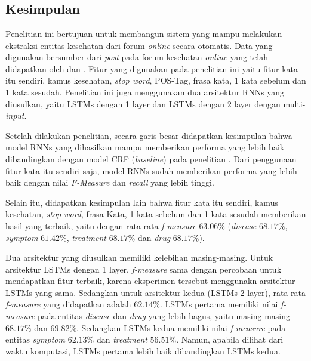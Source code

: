 \chapter{\babEnam}

\section{Kesimpulan}
Penelitian ini bertujuan untuk membangun sistem yang mampu melakukan ekstraksi entitas kesehatan dari forum \textit{online} secara otomatis. Data yang digunakan bersumber dari \textit{post} pada forum kesehatan \textit{online} yang telah didapatkan oleh \cite{skripsiKakRadit} dan \saya. Fitur yang digunakan pada penelitian ini yaitu fitur kata itu sendiri, kamus kesehatan, \textit{stop word}, POS-Tag, frasa kata,  1 kata sebelum dan 1 kata sesudah. Penelitian ini juga menggunakan dua arsitektur RNNs yang diusulkan, yaitu LSTMs dengan 1 layer dan LSTMs dengan 2 layer dengan multi-\textit{input}.

Setelah dilakukan penelitian, secara garis besar didapatkan kesimpulan bahwa model RNNs yang dihasilkan mampu memberikan performa yang lebih baik dibandingkan dengan model CRF (\textit{baseline}) pada penelitian \cite{skripsiKakRadit}. Dari penggunaan fitur kata itu sendiri saja, model RNNs sudah memberikan performa yang lebih baik dengan nilai \textit{F-Measure} dan \textit{recall} yang lebih tinggi.

Selain itu, didapatkan kesimpulan lain bahwa fitur kata itu sendiri, kamus kesehatan, \textit{stop word}, frasa Kata,  1 kata sebelum dan 1 kata sesudah memberikan hasil yang terbaik, yaitu dengan rata-rata \textit{f-measure} $ 63.06\% $ (\textit{disease} $ 68.17\% $, \textit{symptom} $ 61.42\% $, \textit{treatment} $ 68.17\% $ dan \textit{drug} $ 68.17\% $).

Dua arsitektur yang diusulkan memiliki kelebihan masing-masing. Untuk arsitektur LSTMs dengan 1 layer, \textit{f-measure} sama dengan percobaan untuk mendapatkan fitur terbaik, karena eksperimen tersebut menggunakn arsitektur LSTMs yang sama. Sedangkan untuk arsitektur kedua (LSTMs 2 layer), rata-rata \textit{f-measure} yang didapatkan adalah $ 62.14\% $. LSTMs pertama memiliki nilai \textit{f-measure} pada entitas \textit{disease} dan \textit{drug} yang lebih bagus, yaitu masing-masing $ 68.17\% $ dan $ 69.82\% $. Sedangkan LSTMs kedua memiliki nilai \textit{f-measure} pada entitas \textit{symptom} $ 62.13\% $ dan \textit{treatment} $ 56.51\% $. Namun, apabila dilihat dari waktu komputasi, LSTMs pertama lebih baik dibandingkan LSTMs kedua.


